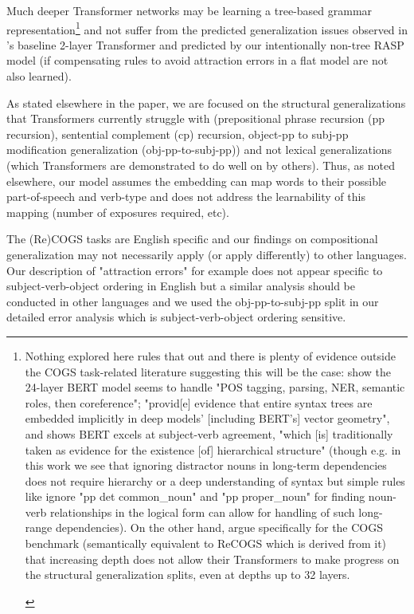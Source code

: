 \documentclass[11pt]{article}
\begin{document}
Much deeper Transformer networks may be learning a tree-based grammar representation\footnote{\begin{footnotesize}Nothing explored here rules that out and there is plenty of evidence outside the COGS task-related literature suggesting this will be the case: \cite{tenney2019bertrediscoversclassicalnlp} show the 24-layer BERT model seems to handle "POS tagging, parsing, NER, semantic roles, then coreference"; \cite{hewitt-manning-2019-structural} "provid[e] evidence that entire syntax trees are embedded implicitly in deep models’ [including BERT's] vector geometry", and \cite{goldberg2019assessingbertssyntacticabilities} shows BERT excels at subject-verb agreement, "which [is] traditionally taken as evidence for
the existence [of] hierarchical structure" (though e.g. in this work we see that ignoring distractor nouns in long-term dependencies does not require hierarchy or a deep understanding of syntax but simple rules like ignore "pp det common\_noun" and "pp proper\_noun" for finding noun-verb relationships in the logical form can allow for handling of such long-range dependencies). On the other hand, \cite{petty2024impactdepthcompositionalgeneralization} argue specifically for the COGS benchmark (semantically equivalent to ReCOGS which is derived from it) that increasing depth does not allow their Transformers to make progress on the structural generalization splits, even at depths up to 32 layers.
\end{footnotesize}
} and not suffer from the predicted generalization issues observed in \cite{Wu2023}'s baseline 2-layer Transformer and predicted by our intentionally non-tree RASP model (if compensating rules to avoid attraction errors in a flat model are not also learned).

As stated elsewhere in the paper, we are focused on the structural generalizations that Transformers currently struggle with (prepositional phrase recursion (pp recursion), sentential complement (cp) recursion, object-pp to subj-pp modification generalization (obj-pp-to-subj-pp)) and not lexical generalizations (which Transformers are demonstrated to do well on by others). Thus, as noted elsewhere, our model assumes the embedding can map words to their possible part-of-speech and verb-type and does not address the learnability of this mapping (number of exposures required, etc).

The (Re)COGS tasks are English specific and our findings on compositional generalization may not necessarily apply (or apply differently) to other languages. Our description of "attraction errors" for example does not appear specific to subject-verb-object ordering in English but a similar analysis should be conducted in other languages and we used the obj-pp-to-subj-pp split in our detailed error analysis which is subject-verb-object ordering sensitive.
\end{document}
